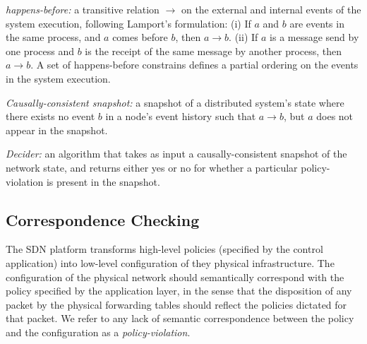 {\em happens-before:} a transitive relation $\rightarrow$ on the external and internal events of
the system execution, following Lamport's
formulation\cite{Lamport:1978:TCO:359545.359563}: (i) If $a$ and $b$ are
events in the same process, and $a$ comes before $b$, then $a \rightarrow b$.
(ii) If $a$ is a message send by one process and $b$ is the receipt of the
same message by another process, then $a \rightarrow b$. A set of
happens-before constrains defines a partial ordering on the events in the
system execution.

{\em Causally-consistent snapshot:} a snapshot of a distributed system's state where
there exists no event $b$ in a node's event history such that $a \rightarrow
b$, but $a$ does not appear in the snapshot.

{\em Decider:} an algorithm that takes as input a causally-consistent snapshot of the
network state, and returns either yes or no for whether a particular
policy-violation is present in the snapshot.

\subsection{Correspondence Checking}

  

The SDN platform transforms high-level policies (specified by the control application) into low-level configuration of they physical infrastructure.
The configuration of the physical network should semantically correspond with the policy specified by the application layer, in the sense that the disposition of any packet by the physical forwarding tables should reflect  the policies dictated for that packet. We refer to any lack of semantic correspondence
between the policy and the configuration as a {\it policy-violation}.

